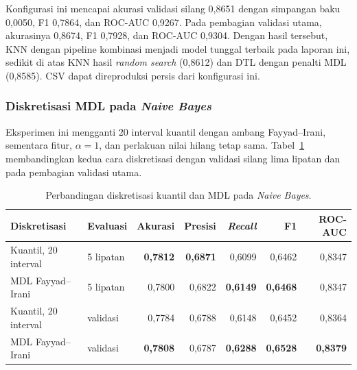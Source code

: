 Konfigurasi ini mencapai akurasi validasi silang 0,8651 dengan simpangan baku 0,0050, F1 0,7864, dan ROC-AUC 0,9267. Pada pembagian validasi utama, akurasinya 0,8674, F1 0,7928, dan ROC-AUC 0,9304. Dengan hasil tersebut, KNN dengan pipeline kombinasi menjadi model tunggal terbaik pada laporan ini, sedikit di atas KNN hasil \textit{random search} (0,8612) dan DTL dengan penalti MDL (0,8585). CSV  dapat direproduksi persis dari konfigurasi ini.

\subsubsection{Diskretisasi MDL pada \textit{Naive Bayes}}
Eksperimen ini mengganti 20 interval kuantil dengan ambang Fayyad--Irani, sementara fitur, $\alpha=1$, dan perlakuan nilai hilang tetap sama. Tabel~\ref{tab:nb-mdl} membandingkan kedua cara diskretisasi dengan validasi silang lima lipatan dan pada pembagian validasi utama.

\begin{table}[htbp]
    \centering
    \small
    \begin{tabular}{@{}l l r r r r r@{}}
        \toprule
        Diskretisasi & Evaluasi & Akurasi & Presisi & \textit{Recall} & F1 & ROC-AUC \\
        \midrule
        Kuantil, 20 interval & 5 lipatan & \textbf{0,7812} & \textbf{0,6871} & 0,6099 & 0,6462 & 0,8347 \\
        MDL Fayyad--Irani & 5 lipatan & 0,7800 & 0,6822 & \textbf{0,6149} & \textbf{0,6468} & 0,8347 \\
        \midrule
        Kuantil, 20 interval & validasi & 0,7784 & 0,6788 & 0,6148 & 0,6452 & 0,8364 \\
        MDL Fayyad--Irani & validasi & \textbf{0,7808} & 0,6787 & \textbf{0,6288} & \textbf{0,6528} & \textbf{0,8379} \\
        \bottomrule
    \end{tabular}
    \caption{Perbandingan diskretisasi kuantil dan MDL pada \textit{Naive Bayes}.}
    \label{tab:nb-mdl}
\end{table}

